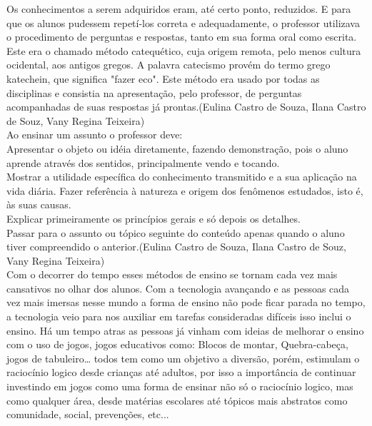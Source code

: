 \documentclass[12pt]{article}
\begin{document}
	Os conhecimentos a serem adquiridos eram, até certo ponto, reduzidos. E para que os alunos pudessem repetí-los correta e adequadamente, o professor utilizava o procedimento de perguntas e respostas, tanto em sua forma oral como escrita. Este era o chamado método catequético, cuja origem remota, pelo menos cultura ocidental, aos antigos gregos. A palavra catecismo provém do termo grego katechein, que significa "fazer eco". Este método era usado por todas as disciplinas e consistia na apresentação, pelo professor, de perguntas acompanhadas de suas respostas já prontas.(Eulina Castro de Souza, Ilana Castro de Souz, Vany Regina Teixeira)\\
	
	Ao ensinar um assunto o professor deve:\\
	
	Apresentar o objeto ou idéia diretamente, fazendo demonstração, pois o aluno aprende através dos sentidos, principalmente vendo e tocando.\\
	
	Mostrar a utilidade específica do conhecimento transmitido e a sua aplicação na vida diária.
	Fazer referência à natureza e origem dos fenômenos estudados, isto é, às suas causas.\\
	
	Explicar primeiramente os princípios gerais e só depois os detalhes.\\
	
	Passar para o assunto ou tópico seguinte do conteúdo apenas quando o aluno tiver compreendido o anterior.(Eulina Castro de Souza, Ilana Castro de Souz, Vany Regina Teixeira)\\
	
	Com o decorrer do tempo esses métodos de ensino se tornam cada vez mais cansativos no olhar dos alunos. Com a tecnologia avançando e as pessoas cada vez mais imersas nesse mundo a forma de ensino não pode ficar parada no tempo, a tecnologia veio para nos auxiliar em tarefas consideradas difíceis isso inclui o ensino. Há um tempo atras as pessoas já vinham com ideias de melhorar o ensino com o uso de jogos, jogos educativos como: Blocos de montar, Quebra-cabeça, jogos de tabuleiro… todos tem como um objetivo a diversão, porém, estimulam o raciocínio logico desde crianças até adultos, por isso a importância de continuar investindo em jogos como uma forma de ensinar não só o raciocínio logico, mas como qualquer área, desde matérias escolares até tópicos mais abstratos como comunidade, social, prevenções, etc...
	
\end{document}
